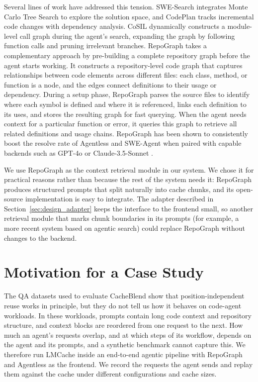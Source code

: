 Several lines of work have addressed this tension. SWE-Search \cite{antoniades2025swesearchenhancingsoftwareagents} integrates Monte Carlo Tree Search to explore the solution space, and CodePlan \cite{bairi2023codeplanrepositorylevelcodingusing} tracks incremental code changes with dependency analysis. CoSIL \cite{jiang2025cosilsoftwareissuelocalization} dynamically constructs a module-level call graph during the agent's search, expanding the graph by following function calls and pruning irrelevant branches. RepoGraph \cite{ouyang2025repographenhancingaisoftware} takes a complementary approach by pre-building a complete repository graph before the agent starts working. It constructs a repository-level code graph that captures relationships between code elements across different files: each class, method, or function is a node, and the edges connect definitions to their usage or dependency. During a setup phase, RepoGraph parses the source files to identify where each symbol is defined and where it is referenced, links each definition to its uses, and stores the resulting graph for fast querying. When the agent needs context for a particular function or error, it queries this graph to retrieve all related definitions and usage chains. RepoGraph has been shown to consistently boost the resolve rate of Agentless and SWE-Agent when paired with capable backends such as GPT-4o or Claude-3.5-Sonnet \cite{ouyang2025repographenhancingaisoftware}.

We use RepoGraph as the context retrieval module in our system. We chose it for practical reasons rather than because the rest of the system needs it: RepoGraph produces structured prompts that split naturally into cache chunks, and its open-source implementation is easy to integrate. The adapter described in Section~\ref{sec:design_adapter} keeps the interface to the frontend small, so another retrieval module that marks chunk boundaries in its prompts (for example, a more recent system based on agentic search) could replace RepoGraph without changes to the backend.

\section{Motivation for a Case Study}
\label{sec:bg_motivation}

The QA datasets used to evaluate CacheBlend show that position-independent reuse works in principle, but they do not tell us how it behaves on code-agent workloads. In these workloads, prompts contain long code context and repository structure, and context blocks are reordered from one request to the next. How much an agent's requests overlap, and at which steps of its workflow, depends on the agent and its prompts, and a synthetic benchmark cannot capture this. We therefore run LMCache inside an end-to-end agentic pipeline with RepoGraph and Agentless as the frontend. We record the requests the agent sends and replay them against the cache under different configurations and cache sizes.

